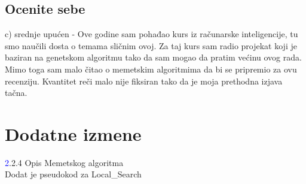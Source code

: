\documentclass[a4paper]{report}
\newcommand{\odgovor}[1]{\textcolor{blue}{#1}}
\begin{document}
\section{Ocenite sebe}
c) srednje upućen
 - Ove godine sam pohađao kurs iz računarske inteligencije, tu smo naučili dosta o temama sličnim ovoj. Za taj kurs sam radio projekat koji je baziran na genetskom algoritmu tako da sam mogao da pratim većinu ovog rada. Mimo toga sam malo čitao o memetskim algoritmima da bi se pripremio za ovu recenziju. Kvantitet reči malo nije fiksiran tako da je moja prethodna izjava tačna.


\chapter{Dodatne izmene}

\odgovor 2.2.4 Opis Memetskog algoritma \\
Dodat je pseudokod za Local\_Search
\end{document}
